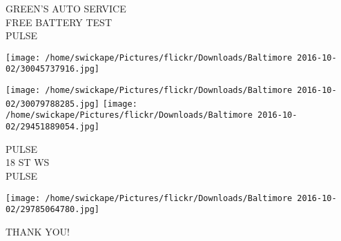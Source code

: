 \documentclass[10pt,letterpaper]{article}
\begin{document}
GREEN'S AUTO SERVICE\\
FREE BATTERY TEST\\
PULSE
\pagebreak

\texttt{[image: /home/swickape/Pictures/flickr/Downloads/Baltimore 2016-10-02/30045737916.jpg]}

\vspace{0.25in}
\texttt{[image: /home/swickape/Pictures/flickr/Downloads/Baltimore 2016-10-02/30079788285.jpg]}
\texttt{[image: /home/swickape/Pictures/flickr/Downloads/Baltimore 2016-10-02/29451889054.jpg]}

PULSE\\
18 ST WS\\
PULSE
\pagebreak

\texttt{[image: /home/swickape/Pictures/flickr/Downloads/Baltimore 2016-10-02/29785064780.jpg]}

THANK YOU!
\pagebreak
\end{document}
